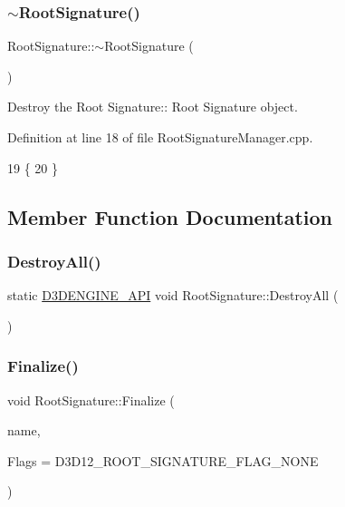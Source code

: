 \subsubsection{\texorpdfstring{$\sim$\+Root\+Signature()}{~RootSignature()}}
{\footnotesize\ttfamily Root\+Signature\+::$\sim$\+Root\+Signature (\begin{DoxyParamCaption}{ }\end{DoxyParamCaption})}



Destroy the Root Signature\+:\+: Root Signature object. 



Definition at line 18 of file Root\+Signature\+Manager.\+cpp.


\begin{DoxyCode}
19 \{
20 \}
\end{DoxyCode}


\subsection{Member Function Documentation}
\mbox{\label{class_root_signature_a9dbe7dee4131ab004588a9b5805373fb}} 
\subsubsection{\texorpdfstring{Destroy\+All()}{DestroyAll()}}
{\footnotesize\ttfamily static \mbox{\hyperlink{stdafx_8h_a8ee2d990c5dfba7794dd2b60741d7722}{D3\+D\+E\+N\+G\+I\+N\+E\+\_\+\+A\+PI}} void Root\+Signature\+::\+Destroy\+All (\begin{DoxyParamCaption}\item[{void}]{ }\end{DoxyParamCaption})\hspace{0.3cm}{\ttfamily [static]}}

\mbox{\label{class_root_signature_add0b5d37697d4677e544b64a20d7f814}} 
\subsubsection{\texorpdfstring{Finalize()}{Finalize()}}
{\footnotesize\ttfamily void Root\+Signature\+::\+Finalize (\begin{DoxyParamCaption}\item[{const std\+::wstring \&}]{name,  }\item[{D3\+D12\+\_\+\+R\+O\+O\+T\+\_\+\+S\+I\+G\+N\+A\+T\+U\+R\+E\+\_\+\+F\+L\+A\+GS}]{Flags = {\ttfamily D3D12\+\_\+ROOT\+\_\+SIGNATURE\+\_\+FLAG\+\_\+NONE} }\end{DoxyParamCaption})}




